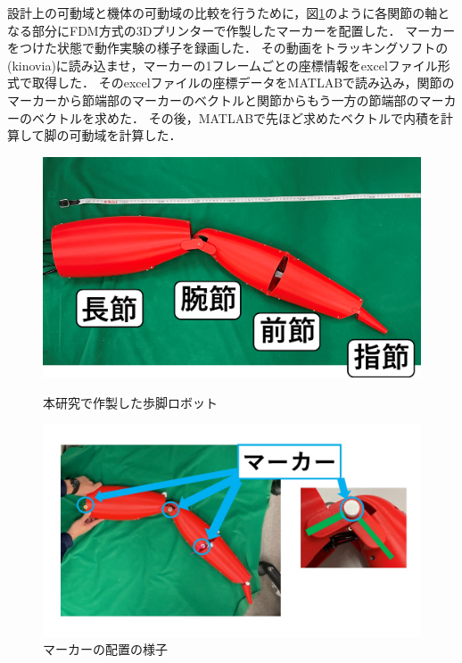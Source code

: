 設計上の可動域と機体の可動域の比較を行うために，図\ref{fig:marker_jikki}のように各関節の軸となる部分にFDM方式の3Dプリンターで作製したマーカーを配置した．
マーカーをつけた状態で動作実験の様子を録画した．
その動画をトラッキングソフトの(kinovia)に読み込ませ，マーカーの1フレームごとの座標情報をexcelファイル形式で取得した．
そのexcelファイルの座標データをMATLABで読み込み，関節のマーカーから節端部のマーカーのベクトルと関節からもう一方の節端部のマーカーのベクトルを求めた．
その後，MATLABで先ほど求めたベクトルで内積を計算して脚の可動域を計算した．
\begin{figure}[hb]
    \begin{minipage}{0.49\hsize}
      \centering
      \includegraphics[scale=0.2]{image/jikki_2.png}
      \caption{本研究で作製した歩脚ロボット}
      \label{fig:kanirobot_new}
    \end{minipage}
    \begin{minipage}{0.49\hsize}
      \centering
      \includegraphics[scale=0.2]{image/marker.jpg}
      \caption{マーカーの配置の様子}
      \label{fig:marker_jikki}
    \end{minipage}
\end{figure}

